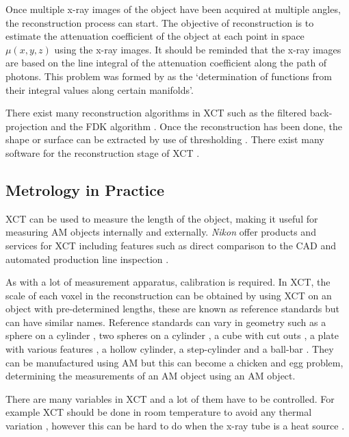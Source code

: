 Once multiple x-ray images of the object have been acquired at multiple angles, the reconstruction process can start. The objective of reconstruction is to estimate the attenuation coefficient of the object at each point in space $\mu(x,y,z)$ using the x-ray images. It should be reminded that the x-ray images are based on the line integral of the attenuation coefficient along the path of photons. This problem was formed by \cite{radon1986on} as the `determination of functions from their integral values along certain manifolds'.

There exist many reconstruction algorithms in XCT \citep{smith1990cone} such as the filtered back-projection \citep{brooks1976principles} and the FDK algorithm \citep{feldkamp1984practical}. Once the reconstruction has been done, the shape or surface can be extracted by use of thresholding \citep{kruth2011computed}. There exist many software for the reconstruction stage of XCT \citep{reinhart2008industrial, sun2012overview}.

\subsection{Metrology in Practice}

XCT can be used to measure the length of the object, making it useful for measuring AM objects internally and externally. \emph{Nikon} offer products and services for XCT including features such as direct comparison to the CAD \citep{nikon2015microfocus, nikon2018mct225} and automated production line inspection \citep{nikon2015inline, nikon2018automated}.

As with a lot of measurement apparatus, calibration is required. In XCT, the scale of each voxel in the reconstruction can be obtained by using XCT on an object with pre-determined lengths, these are known as reference standards \citep{bartscher2007enhancement} but can have similar names. Reference standards can vary in geometry such as a sphere on a cylinder \citep{lifton2013application}, two spheres on a cylinder \citep{sun2016reference}, a cube with cut outs \citep{kiekens2011test}, a plate with various features \citep{moylan2014additive, mohring2015testpart}, a hollow cylinder, a step-cylinder and a ball-bar \citep{bartscher2007enhancement}. They can be manufactured using AM \citep{mohring2015testpart} but this can become a chicken and egg problem, determining the measurements of an AM object using an AM object.

There are many variables in XCT and a lot of them have to be controlled. For example XCT should be done in room temperature to avoid any thermal variation \citep{bryan1990international}, however this can be hard to do when the x-ray tube is a heat source \citep{kruth2011computed}.

